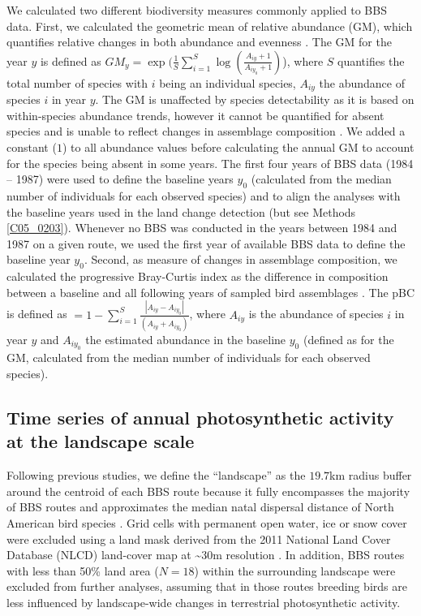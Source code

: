 We calculated two different biodiversity measures commonly applied to BBS data. First, we calculated the geometric mean of relative abundance (GM), which quantifies relative changes in both abundance and evenness \citep{Buckland2011,Buckland2017,Harrison2014}. The GM for the year $y$ is defined as $GM_{y} = \exp(\frac{1}{S} \sum_{i=1}^{S} \log(\frac{ A_{iy}+1 }{A_{iy_0}+1 })$), where $S$ quantifies the total number of species with $i$ being an individual species, $A_{iy}$ the abundance of species $i$ in year $y$. The GM is unaffected by species detectability as it is based on within-species abundance trends, however it cannot be quantified for absent species and is unable to reflect changes in assemblage composition \citep{Buckland2011}. We added a constant ($1$) to all abundance values before calculating the annual GM to account for the species being absent in some years. The first four years of BBS data (1984 – 1987) were used to define the baseline years $y_{0}$ (calculated from the median number of individuals for each observed species) and to align the analyses with the baseline years used in the land change detection (but see Methods \ref{C05_0203}). Whenever no BBS was conducted in the years between 1984 and 1987 on a given route, we used the first year of available BBS data to define the baseline year $y_0$. Second, as measure of changes in assemblage composition, we calculated the progressive Bray-Curtis index \citep[pBC, ][]{Bray1957,Rittenhouse2010} as the difference in composition between a baseline and all following years of sampled bird assemblages \citep{Rittenhouse2010}. The pBC is defined as $ = 1 - \sum_{i=1}^{S} \frac{ |A_{iy} - A_{iy_0}| }{ (A_{iy} + A_{iy_{0}}) } $, where $A_{iy}$ is the abundance of species $i$ in year $y$ and $A_{iy_{0}}$ the estimated abundance in the baseline $y_0$ (defined as for the GM, calculated from the median number of individuals for each observed species).


\subsection{Time series of annual photosynthetic activity at the landscape scale}
\label{C05_0202}

Following previous studies, we define the “landscape” as the $19.7$km radius buffer around the centroid of each BBS route because it fully encompasses the majority of BBS routes and approximates the median natal dispersal distance of North American bird species \citep{Sutherland2000,Pidgeon2007,Albright2011}. Grid cells with permanent open water, ice or snow cover were excluded using a land mask derived from the 2011 National Land Cover Database (NLCD) land-cover map at \textasciitilde 30m resolution \citep{Homer2015}. In addition, BBS routes with less than 50\% land area ($N = 18$) within the surrounding landscape were excluded from further analyses, assuming that in those routes breeding birds are less influenced by landscape-wide changes in terrestrial photosynthetic activity.


